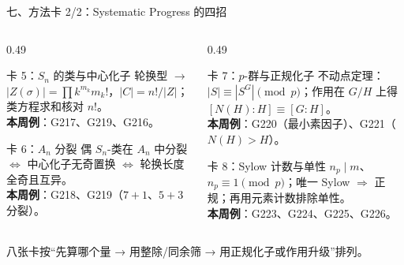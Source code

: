 \documentclass[aspectratio=169,10pt,fontset=none]{ctexbeamer}
\newcommand{\key}[1]{\textcolor{ink}{\bfseries #1}}
\begin{document}
\begin{frame}[t]{七、方法卡 2/2：Systematic Progress 的四招}
  \begin{columns}[T,onlytextwidth]
    \begin{column}{0.49\textwidth}
      \begin{block}{\footnotesize 卡 5：$S_n$ 的类与中心化子}
        \scriptsize
        轮换型 $\to$ $|Z(\sigma)|=\prod k^{m_k}m_k!$，$|C|=n!/|Z|$；类方程求和核对 $n!$。\\
        \key{本周例}：G217、G219、G216。
      \end{block}
      \begin{block}{\footnotesize 卡 6：$A_n$ 分裂}
        \scriptsize
        偶 $S_n$-类在 $A_n$ 中分裂 $\iff$ 中心化子无奇置换 $\iff$ 轮换长度全奇且互异。\\
        \key{本周例}：G218、G219（$7+1$、$5+3$ 分裂）。
      \end{block}
    \end{column}
    \begin{column}{0.49\textwidth}
      \begin{block}{\footnotesize 卡 7：$p$-群与正规化子}
        \scriptsize
        不动点定理：$|S|\equiv|S^G|\pmod p$；作用在 $G/H$ 上得 $[N(H):H]\equiv[G:H]$。\\
        \key{本周例}：G220（最小素因子）、G221（$N(H)>H$）。
      \end{block}
      \begin{block}{\footnotesize 卡 8：Sylow 计数与单性}
        \scriptsize
        $n_p\mid m$、$n_p\equiv1\pmod p$；唯一 Sylow $\Rightarrow$ 正规；再用元素计数排除单性。\\
        \key{本周例}：G223、G224、G225、G226。
      \end{block}
    \end{column}
  \end{columns}
  \vspace{0.2em}
  {\scriptsize\color{ink!70} 八张卡按“先算哪个量 → 用整除/同余筛 → 用正规化子或作用升级”排列。}
\end{frame}
\end{document}
